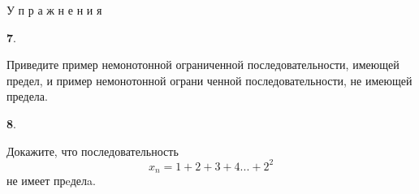 \begin{minipage}{.45\textwidth}
    \hspace{0.5cm}У п р а ж н е н и я
    
    \hspace{0.5cm}\textbf{7}. 
    \begin{tiny}
    Приведите пример немонотонной ограниченной последовательности, имеющей предел, и пример немонотонной ограни ченной последовательности, не имеющей предела.
    \end{tiny}
    
    \hspace{0.5cm}\textbf{8}. 
    \begin{tiny}
    Докажите, что последовательность 
    \[x_n = 1 + 2 + 3 + 4 ... +2^2\]не имеет прeделa.
    \end{tiny}
    \\\\\\\\\\
\end{minipage}